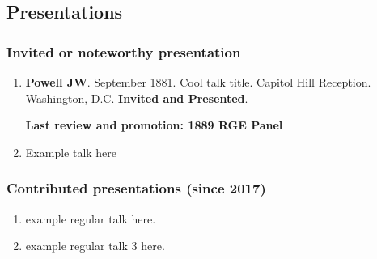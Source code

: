 \subsection{Presentations}


\subsubsection*{Invited or noteworthy presentation}

\begin{enumerate}
\item 
\textbf{Powell JW}.
September 1881.
Cool talk title.
Capitol Hill Reception.
Washington, D.C.
\textbf{Invited and Presented}.\label{talk1example}

\noindent\makebox[\linewidth]{\rule{\textwidth}{1pt}}
\textbf{Last review and promotion: 1889 RGE Panel} 

\item Example talk here
\setcounter{presentCount}{\value{enumi}}
  
\end{enumerate}


\subsubsection*{Contributed presentations (since 2017)}

\begin{enumerate}
  \setcounter{enumi}{\value{presentCount}}

  \item
  example regular talk here.
  \item
  example regular talk 3 here.
  
\end{enumerate}